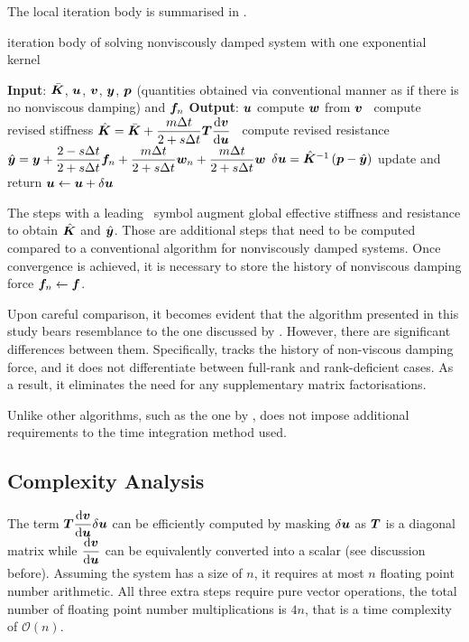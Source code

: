 The local iteration body is summarised in .
\begin{breakablealgorithm}
\caption{iteration body of solving nonviscously damped system with one exponential kernel}\label{algo:single_model}
\begin{algorithmic}
\State \textbf{Input}: $\bar{\bm{K}}$, $\bm{u}$, $\bm{v}$, $\bm{y}$, $\bm{p}$ (quantities obtained via conventional manner as if there is no nonviscous damping) and $\bm{f}_n$
\State \textbf{Output}: $\bm{u}$
\State compute $\bm{w}$ from $\bm{v}$
\State \faMicrochip~compute revised stiffness $\hat{\bm{K}}=\bar{\bm{K}}+\dfrac{m\Delta{}t}{2+s\Delta{}t}\bm{T}\dfrac{\mathrm{d}\bm{v}}{\mathrm{d}\bm{u}}$
\State \faMicrochip~compute revised resistance $\hat{\bm{y}}=\bm{y}+\dfrac{2-s\Delta{}t}{2+s\Delta{}t}\bm{f}_n+\dfrac{m\Delta{}t}{2+s\Delta{}t}\bm{w}_n+\dfrac{m\Delta{}t}{2+s\Delta{}t}\bm{w}$
\State $\delta\bm{u}=\hat{\bm{K}}^{-1}\left(\bm{p}-\hat{\bm{y}}\right)$
\State update and return $\bm{u}\leftarrow\bm{u}+\delta\bm{u}$
\end{algorithmic}
\end{breakablealgorithm}
The steps with a leading \faMicrochip~symbol augment global effective stiffness and resistance to obtain $\hat{\bm{K}}$ and $\hat{\bm{y}}$. Those are additional steps that need to be computed compared to a conventional algorithm for nonviscously damped systems. Once convergence is achieved, it is necessary to store the history of nonviscous damping force $\bm{f}_n\leftarrow\bm{f}$.

Upon careful comparison, it becomes evident that the algorithm presented in this study bears resemblance to the one discussed by \citet{Adhikari2004}. However, there are significant differences between them. Specifically,  tracks the history of non-viscous damping force, and it does not differentiate between full-rank and rank-deficient cases. As a result, it eliminates the need for any supplementary matrix factorisations.

Unlike other algorithms, such as the one by \citet{Cortes2009},  does not impose additional requirements to the time integration method used.
\subsection{Complexity Analysis}
The term $\bm{T}\dfrac{\mathrm{d}\bm{v}}{\mathrm{d}\bm{u}}\delta\bm{u}$ can be efficiently computed by masking $\delta\bm{u}$ as $\bm{T}$ is a diagonal matrix while $\dfrac{\mathrm{d}\bm{v}}{\mathrm{d}\bm{u}}$ can be equivalently converted into a scalar (see discussion before). Assuming the system has a size of $n$, it requires at most $n$ floating point number arithmetic. All three extra steps require pure vector operations, the total number of floating point number multiplications is $4n$, that is a time complexity of $\mathcal{O}\left(n\right)$.

